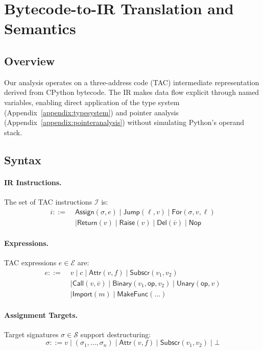 \section{Bytecode-to-IR Translation and Semantics}
\label{appendix:ir}

\subsection{Overview}
Our analysis operates on a three-address code (TAC) intermediate representation derived from CPython bytecode. The IR makes data flow explicit through named variables, enabling direct application of the type system (Appendix~\ref{appendix:typesystem}) and pointer analysis (Appendix~\ref{appendix:pointeranalysis}) without simulating Python's operand stack.

\subsection{Syntax}

\paragraph{IR Instructions.} The set of TAC instructions $\mathcal{I}$ is:
\[
\begin{aligned}
i ::= \;& \mathsf{Assign}(\sigma, e)
\mid \mathsf{Jump}(\ell, v)
\mid \mathsf{For}(\sigma, v, \ell) \\
&\mid \mathsf{Return}(v)
\mid \mathsf{Raise}(v)
\mid \mathsf{Del}(\overline{v})
\mid \mathsf{Nop}
\end{aligned}
\]

\paragraph{Expressions.} TAC expressions $e \in \mathcal{E}$ are:
\[
\begin{aligned}
e ::= \;& v \mid c
\mid \mathsf{Attr}(v, f)
\mid \mathsf{Subscr}(v_1, v_2) \\
&\mid \mathsf{Call}(v, \overline{v})
\mid \mathsf{Binary}(v_1, \mathsf{op}, v_2)
\mid \mathsf{Unary}(\mathsf{op}, v) \\
&\mid \mathsf{Import}(m)
\mid \mathsf{MakeFunc}(\ldots)
\end{aligned}
\]

\paragraph{Assignment Targets.} Target signatures $\sigma \in \mathcal{S}$ support destructuring:
\[
\sigma ::= v \mid (\sigma_1, \ldots, \sigma_n) \mid \mathsf{Attr}(v, f) \mid \mathsf{Subscr}(v_1, v_2) \mid \bot
\]

